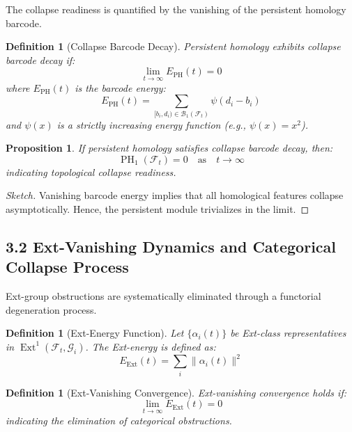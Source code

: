 \documentclass[11pt]{article}
\newtheorem{definition}[theorem]{Definition}
\newtheorem{proposition}[theorem]{Proposition}
\DeclareMathOperator{\Ext}{Ext}
\DeclareMathOperator{\PH}{PH}
\begin{document}
The collapse readiness is quantified by the vanishing of the persistent homology barcode.

\begin{definition}[Collapse Barcode Decay]
Persistent homology exhibits collapse barcode decay if:
\begin{equation}
\lim_{t \to \infty} E_{\mathrm{PH}}(t) = 0
\end{equation}
where $E_{\mathrm{PH}}(t)$ is the barcode energy:
\begin{equation}
E_{\mathrm{PH}}(t) = \sum_{[b_i, d_i) \in \mathcal{B}_1(\mathcal{F}_t)} \psi(d_i - b_i)
\end{equation}
and $\psi(x)$ is a strictly increasing energy function (e.g., $\psi(x) = x^2$).
\end{definition}

\begin{proposition}
If persistent homology satisfies collapse barcode decay, then:
\begin{equation}
\PH_1(\mathcal{F}_t) = 0 \quad \text{as} \quad t \to \infty
\end{equation}
indicating topological collapse readiness.
\end{proposition}

\begin{proof}[Sketch]
Vanishing barcode energy implies that all homological features collapse asymptotically. Hence, the persistent module trivializes in the limit.
\end{proof}

\subsection{3.2 Ext-Vanishing Dynamics and Categorical Collapse Process}

Ext-group obstructions are systematically eliminated through a functorial degeneration process.

\begin{definition}[Ext-Energy Function]
Let $\{\alpha_i(t)\}$ be Ext-class representatives in $\Ext^1(\mathcal{F}_t, \mathcal{G}_i)$. The Ext-energy is defined as:
\begin{equation}
E_{\mathrm{Ext}}(t) = \sum_{i} \| \alpha_i(t) \|^2
\end{equation}
\end{definition}

\begin{definition}[Ext-Vanishing Convergence]
Ext-vanishing convergence holds if:
\begin{equation}
\lim_{t \to \infty} E_{\mathrm{Ext}}(t) = 0
\end{equation}
indicating the elimination of categorical obstructions.
\end{definition}
\end{document}
